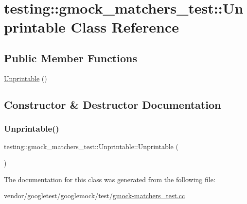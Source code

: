 \hypertarget{classtesting_1_1gmock__matchers__test_1_1_unprintable}{}\section{testing\+:\+:gmock\+\_\+matchers\+\_\+test\+:\+:Unprintable Class Reference}
\label{classtesting_1_1gmock__matchers__test_1_1_unprintable}
\subsection*{Public Member Functions}
\begin{DoxyCompactItemize}
\item 
\hyperlink{classtesting_1_1gmock__matchers__test_1_1_unprintable_a70bca9e23271621ada7f52a4d190677a}{Unprintable} ()
\end{DoxyCompactItemize}


\subsection{Constructor \& Destructor Documentation}
\mbox{\label{classtesting_1_1gmock__matchers__test_1_1_unprintable_a70bca9e23271621ada7f52a4d190677a}} 
\subsubsection{\texorpdfstring{Unprintable()}{Unprintable()}}
{\footnotesize\ttfamily testing\+::gmock\+\_\+matchers\+\_\+test\+::\+Unprintable\+::\+Unprintable (\begin{DoxyParamCaption}{ }\end{DoxyParamCaption})\hspace{0.3cm}{\ttfamily [inline]}}



The documentation for this class was generated from the following file\+:\begin{DoxyCompactItemize}
\item 
vendor/googletest/googlemock/test/\hyperlink{gmock-matchers__test_8cc}{gmock-\/matchers\+\_\+test.\+cc}\end{DoxyCompactItemize}
